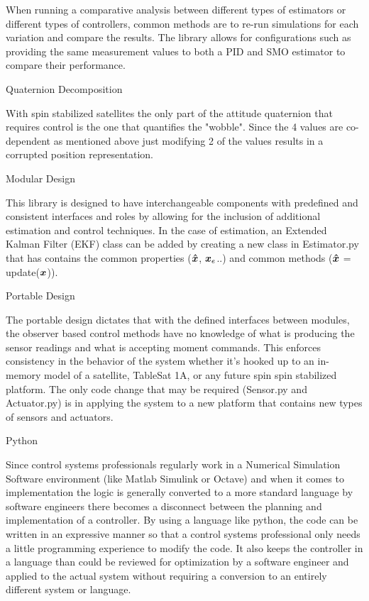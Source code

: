 When running a comparative analysis between different types of estimators or different types of controllers, common methods are to re-run simulations for each variation and compare the results. The library allows for configurations such as providing the same measurement values to both a PID and SMO estimator to compare their performance.

Quaternion Decomposition

With spin stabilized satellites the only part of the attitude quaternion that requires control is the one that quantifies the "wobble". Since the 4 values are co-dependent as mentioned above just modifying 2 of the values results in a corrupted position representation.

Modular Design

This library is designed to have interchangeable components with predefined and consistent interfaces and roles by allowing for the inclusion of additional estimation and control techniques. In the case of estimation, an Extended Kalman Filter (EKF) class can be added by creating a new class in Estimator.py that has contains the common properties ($\boldsymbol{\hat{x}}$, $\boldsymbol{x}_e$..) and common methods ($\boldsymbol{\hat{x}}$ = update($\boldsymbol{x}$)).

Portable Design

The portable design dictates that with the defined interfaces between modules, the observer based control methods have no knowledge of what is producing the sensor readings and what is accepting moment commands. This enforces consistency in the behavior of the system whether it's hooked up to an in-memory model of a satellite, TableSat 1A, or any future spin spin stabilized platform. The only code change that may be required (Sensor.py and Actuator.py) is in applying the system to a new platform that contains new types of sensors and actuators.

Python

Since control systems professionals regularly work in a Numerical Simulation Software environment (like Matlab Simulink or Octave) and when it comes to implementation the logic is generally converted to a more standard language by software engineers there becomes a disconnect between the planning and implementation of a controller. By using a language like python, the code can be written in an expressive manner so that a control systems professional only needs a little programming experience to modify the code. It also keeps the controller in a language than could be reviewed for optimization by a software engineer and applied to the actual system without requiring a conversion to an entirely different system or language.
